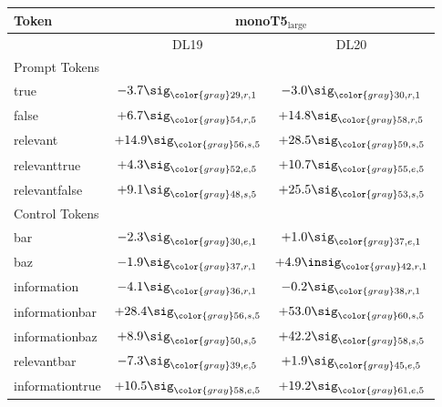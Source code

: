 \begin{table}
    \centering
    \footnotesize
    \setlength{\tabcolsep}{2pt}
    \begin{tabular}{@{}lcc@{}}
    \toprule
    Token & \multicolumn{2}{c}{monoT5$_\text{large}$}\\
    \midrule
    & \multicolumn{1}{c}{DL19} & \multicolumn{1}{c}{DL20}\\
    \midrule
    \midrule
    \multicolumn{3}{l}{Prompt Tokens}\\
    \midrule
    true & \cellcolor{neg!3}$-3.7\sig_{\color{gray}29, r, 1}$ & \cellcolor{neg!3}$-3.0\sig_{\color{gray}30, r, 1}$\\
    false & \cellcolor{pos!6}$+6.7\sig_{\color{gray}54, r, 5}$ & \cellcolor{pos!14}$+14.8\sig_{\color{gray}58, r, 5}$\\
    relevant & \cellcolor{pos!14}$+14.9\sig_{\color{gray}56, s, 5}$ & \cellcolor{pos!27}$+28.5\sig_{\color{gray}59, s, 5}$\\
    relevanttrue & \cellcolor{pos!4}$+4.3\sig_{\color{gray}52, e, 5}$ & \cellcolor{pos!10}$+10.7\sig_{\color{gray}55, e, 5}$\\
    relevantfalse & \cellcolor{pos!9}$+9.1\sig_{\color{gray}48, s, 5}$ & \cellcolor{pos!24}$+25.5\sig_{\color{gray}53, s, 5}$\\
    \midrule
    \multicolumn{3}{l}{Control Tokens}\\
    \midrule
    bar & \cellcolor{neg!2}$-2.3\sig_{\color{gray}30, e, 1}$ & \cellcolor{pos!1}$+1.0\sig_{\color{gray}37, e, 1}$\\
    baz & \cellcolor{neg!2}$-1.9\sig_{\color{gray}37, r, 1}$ & \cellcolor{pos!5}$+4.9\insig_{\color{gray}42, r, 1}$\\
    information & \cellcolor{neg!4}$-4.1\sig_{\color{gray}36, r, 1}$ & \cellcolor{neg!0}$-0.2\sig_{\color{gray}38, r, 1}$\\
    informationbar & \cellcolor{pos!27}$+28.4\sig_{\color{gray}56, s, 5}$ & \cellcolor{pos!50}$+53.0\sig_{\color{gray}60, s, 5}$\\
    informationbaz & \cellcolor{pos!8}$+8.9\sig_{\color{gray}50, s, 5}$ & \cellcolor{pos!40}$+42.2\sig_{\color{gray}58, s, 5}$\\
    relevantbar & \cellcolor{neg!7}$-7.3\sig_{\color{gray}39, e, 5}$ & \cellcolor{pos!2}$+1.9\sig_{\color{gray}45, e, 5}$\\
    informationtrue & \cellcolor{pos!10}$+10.5\sig_{\color{gray}58, e, 5}$ & \cellcolor{pos!18}$+19.2\sig_{\color{gray}61, e, 5}$\\

\end{tabular}
\end{table}
